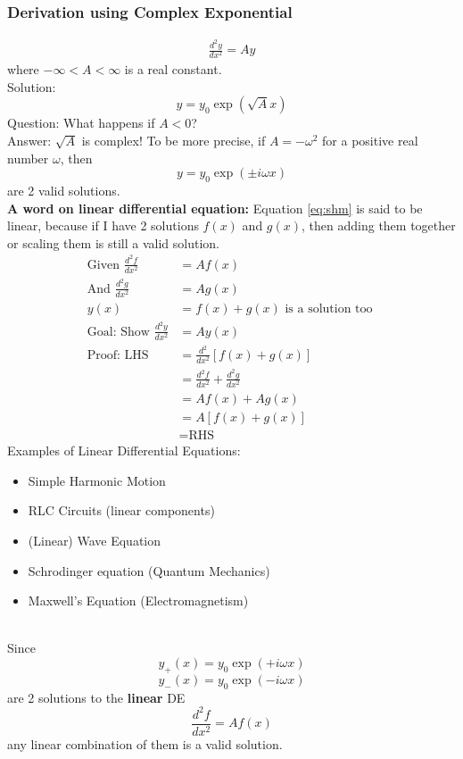 \documentclass{article}
\begin{document}
\subsubsection{Derivation using Complex Exponential }
\begin{align}
    \frac{d^2 y}{ dx^2} = A y     \label{eq:shm}
\end{align}
where $-\infty < A < \infty$ is a real constant.\\[10pt]
Solution: $$y=y_0 \exp(\sqrt{A}x)$$ 
Question: What happens if $A < 0$? \\
Answer: $\sqrt{A}$ is complex! To be more precise, if $A=-\omega^2$ for a positive real number $\omega$, then 
$$y=y_0 \exp(\pm i \omega x)$$
are 2 valid solutions.\\[10pt]
\textbf{A word on linear differential equation: } Equation \ref{eq:shm} is said to be linear, because if I have 2 solutions $f(x)$ and $g(x)$, then adding them together or scaling them is still a valid solution.
\begin{align}
    \text{Given } \frac{d^2 f}{ dx^2} &= A f(x)\\
    \text{And } \frac{d^2 g}{ dx^2} &= A g(x) \\
    y(x) &= f(x) + g(x)\text{ is a solution too }\\
    \text{Goal: Show } \frac{d^2y}{dx^2} & = Ay(x)\\
    \text{Proof: LHS} &= \frac{d^2}{dx^2} [f(x)+g(x)] \\
    &= \frac{d^2 f}{dx^2} + \frac{d^2 g}{dx^2} \\ 
    &= A f(x) + A g(x) \\
    &= A [f(x) + g(x)] \\
    &= \text{RHS}
\end{align}
Examples of Linear Differential Equations:
\begin{itemize}
    \item Simple Harmonic Motion
    \item RLC Circuits (linear components)
    \item (Linear) Wave Equation
    \item Schrodinger equation (Quantum Mechanics)
    \item Maxwell's Equation (Electromagnetism)
\end{itemize}
\leavevmode \\
Since $$y_+(x)=y_0 \exp(+ i \omega x)$$  $$y_-(x) = y_0 \exp(- i \omega x)$$ are 2 solutions to the \textbf{linear} DE $$\frac{d^2 f}{ dx^2} = A f(x)$$
any linear combination of them is a valid solution.
\end{document}
